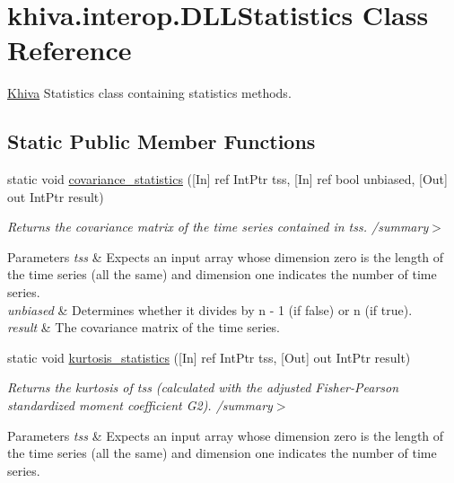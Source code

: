 \hypertarget{classkhiva_1_1interop_1_1_d_l_l_statistics}{}\section{khiva.\+interop.\+D\+L\+L\+Statistics Class Reference}
\label{classkhiva_1_1interop_1_1_d_l_l_statistics}


\mbox{\hyperlink{classkhiva_1_1_khiva}{Khiva}} Statistics class containing statistics methods.  


\subsection*{Static Public Member Functions}
\begin{DoxyCompactItemize}
\item 
static void \mbox{\hyperlink{classkhiva_1_1interop_1_1_d_l_l_statistics_a4469f0b7a6f6e67948fe659de6c3cd7e}{covariance\+\_\+statistics}} (\mbox{[}In\mbox{]} ref Int\+Ptr tss, \mbox{[}In\mbox{]} ref bool unbiased, \mbox{[}Out\mbox{]} out Int\+Ptr result)
\begin{DoxyCompactList}\small\item\em Returns the covariance matrix of the time series contained in tss. /summary$>$ 
\begin{DoxyParams}{Parameters}
{\em tss} & Expects an input array whose dimension zero is the length of the time series (all the same) and dimension one indicates the number of time series.\\
\hline
{\em unbiased} & Determines whether it divides by n -\/ 1 (if false) or n (if true).\\
\hline
{\em result} & The covariance matrix of the time series.\\
\hline
\end{DoxyParams}
\end{DoxyCompactList}\item 
static void \mbox{\hyperlink{classkhiva_1_1interop_1_1_d_l_l_statistics_a4f0b0cb0f247c3ab832a627c69ad5fa4}{kurtosis\+\_\+statistics}} (\mbox{[}In\mbox{]} ref Int\+Ptr tss, \mbox{[}Out\mbox{]} out Int\+Ptr result)
\begin{DoxyCompactList}\small\item\em Returns the kurtosis of tss (calculated with the adjusted Fisher-\/\+Pearson standardized moment coefficient G2). /summary$>$ 
\begin{DoxyParams}{Parameters}
{\em tss} & Expects an input array whose dimension zero is the length of the time series (all the same) and dimension one indicates the number of time series.\\

\end{DoxyParams}
\end{DoxyCompactList}
\end{DoxyCompactItemize}
